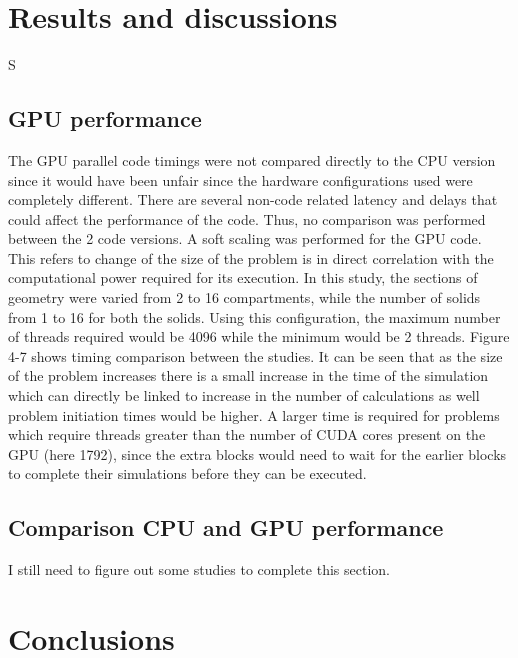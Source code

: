 \documentclass[preprint,10pt,authoryear]{elsarticle}
\begin{document}
\begin{linenumbers}
\section{Results and discussions}
\label{secResults}S
\subsection{GPU performance}
The GPU parallel code timings were not compared directly to the CPU 
version since it would have been unfair since the hardware configurations 
used were completely different. There are several non-code related latency 
and delays that could affect the performance of the code. Thus, no 
comparison was performed between the 2 code versions. 
A soft scaling was performed for the GPU code. This refers to change of 
the size of the problem is in direct correlation with the computational 
power required for its execution. In this study, the sections of geometry 
were varied from 2 to 16 compartments, while the number of solids from 1 
to 16 for both the solids. Using this configuration, the maximum number 
of threads required would be 4096 while the minimum would be 2 threads. 
Figure 4-7 shows timing comparison between the studies. It can be seen 
that as the size of the problem increases there is a small increase in 
the time of the simulation which can directly be linked to increase in 
the number of calculations as well problem initiation times would be 
higher. A larger time is required for problems which require threads 
greater than the number of CUDA cores present on the GPU (here 1792), 
since the extra blocks would need to wait for the earlier blocks to 
complete their simulations before they can be executed.

\subsection{Comparison CPU and GPU performance}

I still need to figure out some studies to complete this section.

\section{Conclusions}
\label{secConc}
\end{linenumbers}



\end{document}
